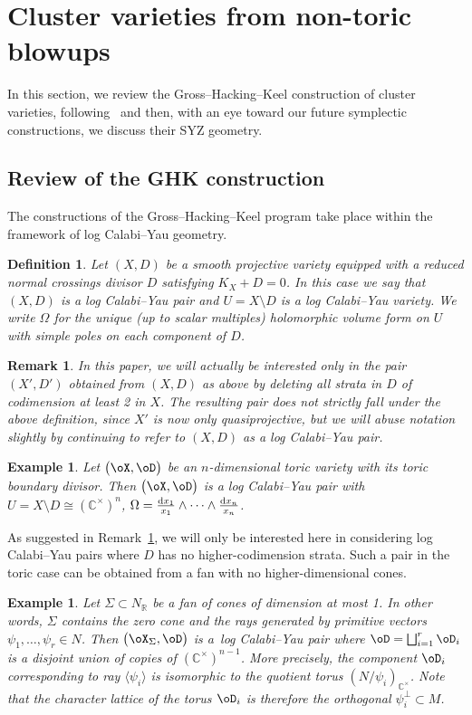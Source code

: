 \documentclass[pdftex]{sigma}%
\numberwithin{equation}{section}
\newtheorem{Definition}[Theorem]{Definition}
\newtheorem{Example}[Theorem]{Example}
\newtheorem{Remark}[Theorem]{Remark} }
\def\CC{\mathbb{C}}
\def\RR{\mathbb{R}}
\begin{document}
\section{Cluster varieties from non-toric blowups}\label{sec2}
In this section, we review the Gross--Hacking--Keel construction of cluster varieties, following~\cite{HK-icm} and then, with an eye toward our future symplectic constructions, we discuss their SYZ geometry.
\subsection{Review of the GHK construction}
The constructions of the Gross--Hacking--Keel program take place within the framework of log Calabi--Yau geometry.

\begin{Definition}
Let $(X,D)$ be a smooth projective variety equipped with a reduced normal crossings divisor $D$ satisfying $K_X+D=0$. In this case we say that $(X,D)$ is a {\em log Calabi--Yau pair} and $U=X\setminus D$ is a {\em log Calabi--Yau variety}. We write $\Omega$ for the unique (up to scalar multiples) holomorphic volume form on $U$ with simple poles on each component of $D$.
\end{Definition}

\begin{Remark}\label{rem:quasiproj-pair}
 In this paper, we will actually be interested only in the pair $(X',D')$ obtained from $(X,D)$ as above by deleting all strata in $D$ of codimension at least 2 in $X$. The resulting pair does not strictly fall under the above definition, since $X'$ is now only quasiprojective, but we will abuse notation slightly by continuing to refer to $(X,D)$ as a log Calabi--Yau pair.
\end{Remark}

\begin{Example}
 Let $\big(\oX,\oD\big)$ be an $n$-dimensional toric variety with its toric boundary divisor. Then $\big(\oX,\oD\big)$ is a log Calabi--Yau pair with $U=X\setminus D\cong (\CC^\times)^n$, $\Omega=\frac{{\rm d}x_1}{x_1}\wedge\cdots\wedge \frac{{\rm d}x_n}{x_n}$.
\end{Example}

As suggested in Remark~\ref{rem:quasiproj-pair}, we will only be interested here in considering log Calabi--Yau pairs where $D$ has no higher-codimension strata. Such a pair in the toric case can be obtained from a fan with no higher-dimensional cones.

\begin{Example}\label{ex:quasiproj-pair}
 Let $\Sigma\subset N_\RR$ be a fan of cones of dimension at most 1. In other words, $\Sigma$ contains the zero cone and the rays generated by primitive vectors $\psi_1,\dots,\psi_r\in N$. Then $\big(\oX_\Sigma,\oD\big)$ is a~log Calabi--Yau pair where $\oD = \bigsqcup_{i=1}^r \oD_i$ is a disjoint union of copies of $(\CC^\times)^{n-1}$. More precisely, the component $\oD_i$ corresponding to ray $\langle \psi_i\rangle$ is isomorphic to the quotient torus $(N/\psi_i)_{\CC^\times}$. Note that the character lattice of the torus $\oD_i$ is therefore the orthogonal $\psi_i^\perp\subset M$.
\end{Example}
\end{document}
